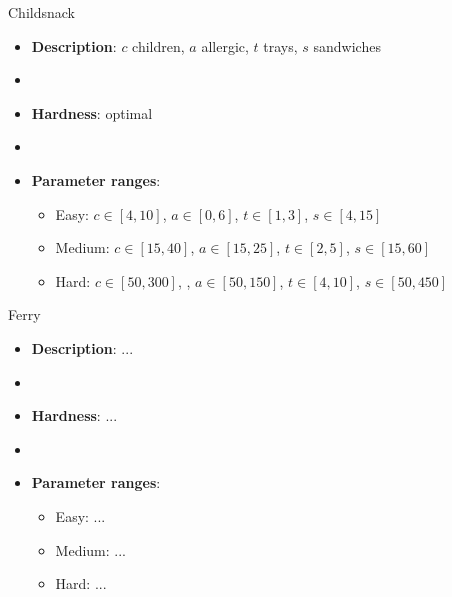 \documentclass[aspectratio=169,xcolor=dvipsnames]{beamer}
\begin{document}
\begin{frame}{Childsnack}

    \begin{itemize}
        \item \textbf{Description}: $c$ children, $a$ allergic, $t$ trays, $s$ sandwiches %
        \item[]
        \item \textbf{Hardness}: optimal
        \item[]
        \item \textbf{Parameter ranges}:
        \begin{itemize}
            \item Easy: $c\in[4, 10]$, $a\in[0, 6]$, $t\in[1, 3]$, $s\in[4, 15]$
            \item Medium: $c\in[15, 40]$, $a\in[15, 25]$, $t\in[2, 5]$, $s\in[15, 60]$
            \item Hard: $c\in[50, 300]$, , $a\in[50, 150]$, $t\in[4, 10]$, $s\in[50, 450]$
        \end{itemize}
    \end{itemize}

\end{frame}


\begin{frame}{Ferry}

    \begin{itemize}
        \item \textbf{Description}: ...
        \item[]
        \item \textbf{Hardness}: ...
        \item[]
        \item \textbf{Parameter ranges}:
        \begin{itemize}
            \item Easy: ...
            \item Medium: ...
            \item Hard: ...
        \end{itemize}
    \end{itemize}

\end{frame}
\end{document}
